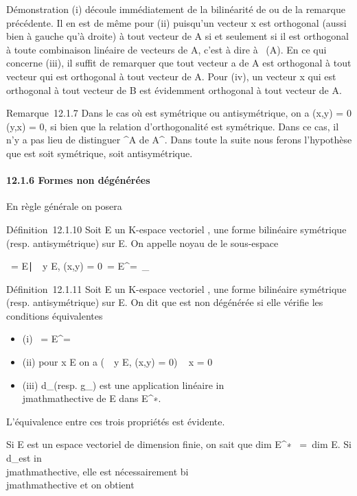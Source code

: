 \documentclass[]{article}
\begin{document}
Démonstration (i) découle immédiatement de la bilinéarité de \phi ou de la
remarque précédente. Il en est de même pour (ii) puisqu'un vecteur x est
orthogonal (aussi bien à gauche qu'à droite) à tout vecteur de A si et
seulement si il est orthogonal à toute combinaison linéaire de vecteurs
de A, c'est à dire à
\mathrmVect~(A). En ce qui
concerne (iii), il suffit de remarquer que tout vecteur a de A est
orthogonal à tout vecteur qui est orthogonal à tout vecteur de A. Pour
(iv), un vecteur x qui est orthogonal à tout vecteur de B est évidemment
orthogonal à tout vecteur de A.

Remarque~12.1.7 Dans le cas où \phi est symétrique ou antisymétrique, on a
\phi(x,y) = 0 \Leftrightarrow \phi(y,x) = 0, si bien que la
relation d'orthogonalité est symétrique. Dans ce cas, il n'y a pas lieu
de distinguer ^\bot A de A^\bot. Dans toute la suite
nous ferons l'hypothèse que \phi est soit symétrique, soit antisymétrique.

\paragraph{12.1.6 Formes non dégénérées}

En règle générale on posera

Définition~12.1.10 Soit E un K-espace vectoriel , \phi une forme bilinéaire
symétrique (resp. antisymétrique) sur E. On appelle noyau de \phi le
sous-espace

\mathrmKer~\phi =
\x \in
E∣\forall~~y \in E, \phi(x,y) =
0\ = E^\bot =\
\mathrmKerd_ \phi

Définition~12.1.11 Soit E un K-espace vectoriel , \phi une forme bilinéaire
symétrique (resp. antisymétrique) sur E. On dit que \phi est non dégénérée
si elle vérifie les conditions équivalentes

\begin{itemize}
\itemsep1pt\parskip0pt
\item
  (i) \mathrmKer~\phi =
  E^\bot = \0\
\item
  (ii) pour x \in E on a \left
  (\forall~~y \in E, \phi(x,y) = 0\right ) \rigtharrow~
  x = 0
\item
  (iii) d_\phi (resp. g_\phi) est une application linéaire
  in\\jmathmathective de E dans E^∗.
\end{itemize}

L'équivalence entre ces trois propriétés est évidente.

Si E est un espace vectoriel de dimension finie, on sait que
dim E^∗~ =\
dim E. Si d_\phi est in\\jmathmathective, elle est nécessairement
bi\\jmathmathective et on obtient
\end{document}
